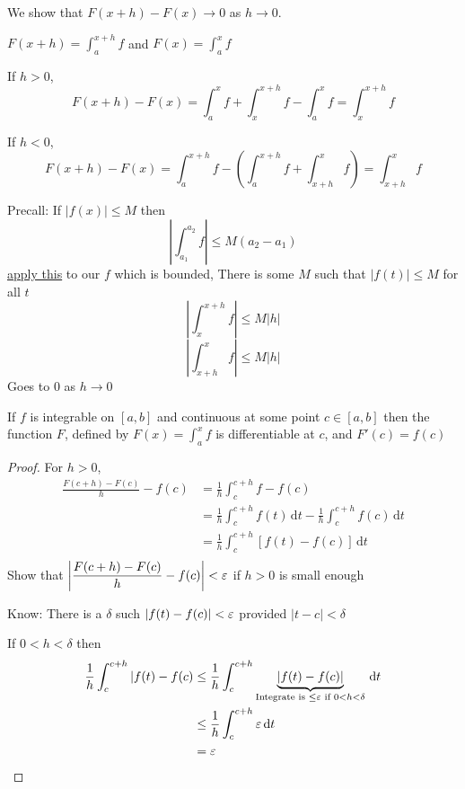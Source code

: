 We show that $F(x+h) - F(x) \to 0$ as $h \to 0$.

$\displaystyle F(x+h) = \int_a^{x+h} f$ and 
$\displaystyle F(x) = \int_a^{x} f$

If $h > 0$, $$\displaystyle F(x+h) - F(x) = \int_a^x f + \int_x^{x+h} f - \int_a^x f = \int_x^{x+h} f$$

If $h < 0$, $$\displaystyle F(x+h) - F(x) = \int_a^{x+h} f -\left( \int_a^{x+h} f + \int_{x+h}^x f\right) = \int_{x+h}^{x} f$$

Precall: If $|f(x)| \le M$ then 
\[\left|\int_{a_1}^{a_2} f\right| \le M(a_2 - a_1)\]
\underline{apply this} to our $f$ which is bounded, There is some  $M$ such that $|f(t)| \le M$ for all $t$
\[\left|\int_{x}^{x+h} f\right| \le M|h|\]
\[\left|\int_{x+h}^{x} f\right| \le M|h|\]
Goes to $0$ as $h \to 0$

\begin{theorem*}
  If $f$ is integrable on $[a, b]$ and continuous at some point $c \in [a, b]$ then the function
  $F$, defined by $\displaystyle F(x) = \int_a^x f$ is differentiable at $c$, and $F'(c) = f(c)$ 
\end{theorem*}

\begin{proof}
  For $h > 0$,
  \begin{align*}
    \frac{F(c+h)-F(c)}{h} - f(c) &= \frac{1}{h}\int_c^{c+h} f - f(c) \\
    &= \frac{1}{h} \int_c^{c+h} f(t) \,\mathrm{d}t - \frac{1}{h}\int_c^{c+h} f(c)\,\mathrm{d}t \\
    &= \frac{1}{h} \int_c^{c+h}[f(t) - f(c)]\,\mathrm{d}t \\
  \end{align*}
  Show that $\displaystyle \left|\frac{F(c+h) - F(c)}{h} - f(c)\right| < \varepsilon$ if $h>0$ is small enough

  Know: There is a $\delta$ such $|f(t) - f(c)| < \varepsilon$ provided $|t-c| < \delta$

  If $0  < h < \delta$ then 
  \begin{align*}
    \frac{1}{h} \int_c^{c+h} |f(t) - f(c) &\le\frac{1}{h} \int_c^{c+h} \underbrace{|f(t)-f(c)|}_{\text{Integrate is } \le \varepsilon \text{ if } 0 < h < \delta}\,\mathrm{d}t \\ 
    &\le \frac{1}{h} \int_c^{c+h} \varepsilon \,\mathrm{d}t \\
    &= \varepsilon
  \end{align*}
\end{proof}

